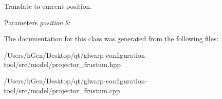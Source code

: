 Translate to current position. 


\begin{DoxyParams}{Parameters}
{\em position} & \\
\hline
\end{DoxyParams}


The documentation for this class was generated from the following files\+:\begin{DoxyCompactItemize}
\item 
/\+Users/h\+Gen/\+Desktop/qt/glwarp-\/configuration-\/tool/src/model/projector\+\_\+frustum.\+hpp\item 
/\+Users/h\+Gen/\+Desktop/qt/glwarp-\/configuration-\/tool/src/model/projector\+\_\+frustum.\+cpp\end{DoxyCompactItemize}
